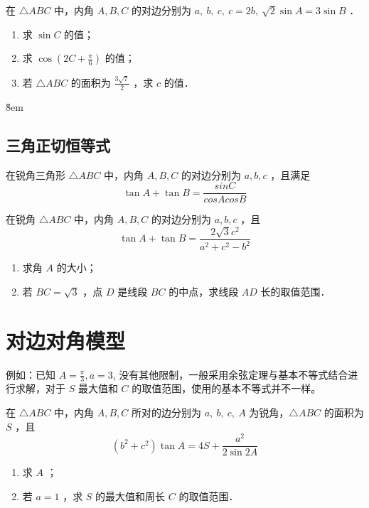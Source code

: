 \begin{example}
    在 $\triangle A B C$ 中，内角 $A, B, C$ 的对边分别为 $a, ~ b, ~ c, ~ c=2 b, ~ \sqrt{2} \sin A=3 \sin B$ ．
    \begin{enumerate}
        \item 求 $\sin C$ 的值；
        \item 求 $\cos \left(2 C+\frac{\pi}{6}\right)$ 的值；
        \item 若 $\triangle A B C$ 的面积为 $\frac{3 \sqrt{7}}{2}$ ，求 $c$ 的值．
    \end{enumerate}
\end{example}
\v{8em}

\subsection{三角正切恒等式}
\begin{theorem}[正切相加恒等式]
    在锐角三角形 $\triangle ABC$ 中，内角 $A, B, C$ 的对边分别为 $a, b, c$ ，且满足
    $$
        \tan A + \tan B = \frac{sinC}{cosAcosB}
    $$
\end{theorem}

\begin{example}
    在锐角 $\triangle A B C$ 中，内角 $A, B, C$ 的对边分别为 $a, b, c$ ，且
    $$
        \tan A+\tan B=\frac{2 \sqrt{3} c^2}{a^2+c^2-b^2}
    $$
    \begin{enumerate}
        \item 求角 $A$ 的大小；
        \item 若 $B C=\sqrt{3}$ ，点 $D$ 是线段 $B C$ 的中点，求线段 $A D$ 长的取值范围．
    \end{enumerate}
\end{example}
\vspace{6em}

\section{对边对角模型}

\begin{theorem}[无限制的对边对角模型]
    例如：已知 $A = \frac{\pi}{3}, a=3$, 没有其他限制，一般采用余弦定理与基本不等式结合进行求解，对于 $S$ 最大值和 $C$ 的取值范围，使用的基本不等式并不一样。
\end{theorem}

\begin{example}
    在 $\triangle A B C$ 中，内角 $A, B, C$ 所对的边分别为 $a, ~ b, ~ c, ~ A$ 为锐角，$\triangle A B C$ 的面积为 $S$ ，且
    $$
        \left(b^2+c^2\right) \tan A=4 S+\frac{a^2}{2 \sin 2 A}
    $$
    \begin{enumerate}
        \item 求 $A$ ；
        \item 若 $a=1$ ，求 $S$ 的最大值和周长 $C$ 的取值范围．
    \end{enumerate}
\end{example}

